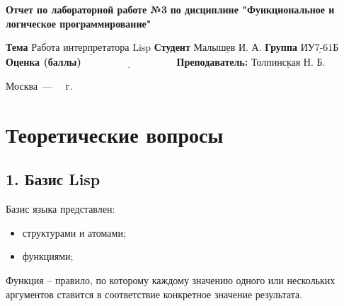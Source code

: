 \documentclass[12pt]{report}
\begin{document}
\begin{titlepage}
	
	\begin{center}
		\noindent\begin{minipage}{1.3\textwidth}\centering
			\Large\textbf{  Отчет по лабораторной работе №3}\newline
			\textbf{по дисциплине \newline "Функциональное и логическое программирование"}\newline\newline
		\end{minipage}
	\end{center}
	
	\noindent\textbf{Тема} $\underline{\text{Работа интерпретатора Lisp}}$\newline\newline
	\noindent\textbf{Студент} $\underline{\text{Малышев И. А.}}$\newline\newline
	\noindent\textbf{Группа} $\underline{\text{ИУ7-61Б}}$\newline\newline
	\noindent\textbf{Оценка (баллы)} $\underline{\text{~~~~~~~~~~~~~~~~~~~~~~~~~~~}}$\newline\newline
	\noindent\textbf{Преподаватель: } $\underline{\text{Толпинская Н. Б.}}$\newline\newline\newline
	
	\begin{center}
		\vfill
		Москва~---~\the\year
		~г.
	\end{center}
\end{titlepage}


\setcounter{page}{2}
\chapter*{Теоретические вопросы}

\section*{1. Базис Lisp}

Базис языка представлен:
\begin{itemize}
	\item структурами и атомами;
	\item функциями;
\end{itemize}

Функция -- правило, по которому каждому значению одного или нескольких аргументов ставится в соответствие конкретное значение результата.
\end{document}
